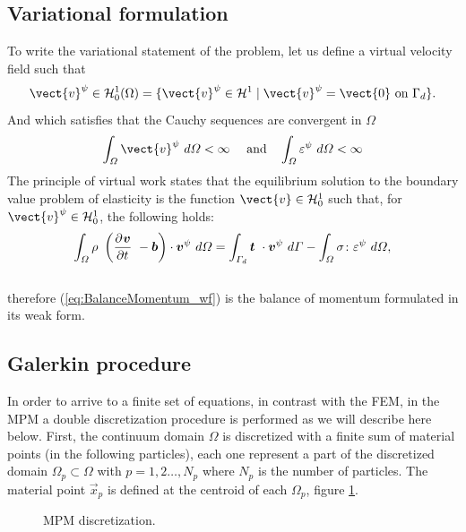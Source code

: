 \subsection{Variational formulation}
\label{sec:variational-formulation}
To write the variational statement of the problem, let us define a
virtual velocity field such that
\begin{equation}
  \label{eq:Hilbert-space}
  \vect{v}^{\psi} \in \mathcal{H}^1_0(\Omega) = \{ \vect{v}^{\psi} \in
  \mathcal{H}^1 \mid \vect{v}^{\psi} = \vect{0}\ \text{on}\ \Gamma_d \}.
\end{equation}
And which satisfies that the Cauchy sequences are convergent in $\varOmega$
\begin{equation}
  \label{eq:cauchy-secuence}
  \Integral{3}{\vect{v}^{\psi}} < \infty\ \quad\text{and}\quad \Integral{3}{\tens{\varepsilon}^{\psi}} < \infty
\end{equation}
The principle of virtual work states that the equilibrium solution to
the boundary value problem of elasticity is the function $\vect{v} \in
\mathcal{H}^1_0$ such that, for $\vect{v}^{\psi} \in
\mathcal{H}^1_0$, the following holds:
\begin{equation}
  \label{eq:BalanceMomentum_wf}
  \Integral{3}{\rho\ \left( \Deriv{\vec{v}}{t}\ - \vec{b} \right) \cdot \vec{v}^{\psi}} =
  \Integral{2}{\vec{t}\ \cdot \vec{v}^{\psi}} - \Integral{3}{\tens{\sigma} \colon
    \tens{\varepsilon}^{\psi}},
\end{equation}\\
therefore (\ref{eq:BalanceMomentum_wf}) is the balance of momentum formulated in
its weak form.

\subsection{Galerkin procedure}
\label{sec:Galerkin-procedure}
In order to arrive to a finite set of equations, in contrast with the
FEM, in the MPM a double discretization procedure is performed as we will
describe here below. First, the continuum domain
$\Omega$ is discretized with a finite sum of material points (in the
following particles), each one
represent a part of the discretized domain $\varOmega_p \subset
\varOmega$ with $p = 1,2\ldots ,N_p$ where $N_p$ is the number of
particles. The material point $\vec{x}_p$ is defined at the centroid
of each $\Omega_p$, figure \ref{fig:MPM-discretization}.

\begin{figure}\sidecaption
  \centering
  \resizebox{\hsize}{!}{
    }
  \caption{MPM discretization.}
  \label{fig:MPM-discretization}
\end{figure}

